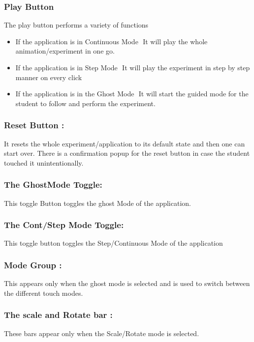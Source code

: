 \documentclass[12pt]{report}
\begin{document}
\subsubsection{Play Button} 
The play button performs a variety of functions 

\begin{itemize}
\item If the application is in Continuous Mode ­ It will play the whole animation/experiment in one go.
\item If the application is in Step Mode ­ It will play the experiment in step by step manner on every click
\item If the application is in the Ghost Mode ­ It will start the guided mode for the student to follow and perform the experiment.
\end{itemize}

\subsubsection{Reset Button :}

It resets the whole experiment/application to its default state and then one can start over. There 
is a confirmation pop­up for the reset button in case the student touched it unintentionally. 

\subsubsection{The GhostMode Toggle:}

This toggle Button toggles the ghost Mode of the application.
\subsubsection{The Cont/Step Mode Toggle:}

This toggle button toggles the Step/Continuous Mode of the application

\subsubsection{Mode Group :} 

This appears only when the ghost mode is selected and is used to switch between the different 
touch modes.

\subsubsection{The scale and Rotate bar :}
These bars appear only when the Scale/Rotate mode is selected.
\end{document}
